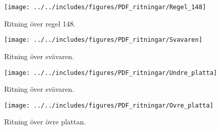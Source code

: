 \begin{landscape}
\begin{figure}[htbp!]
\centering
\texttt{[image: ../../includes/figures/PDF\_ritningar/Regel\_148]}
\caption{Ritning över regel 148.}
\label{fig:regel_148}
\end{figure}
\end{landscape}

\begin{landscape}
\begin{figure}[htbp!]
\centering
\texttt{[image: ../../includes/figures/PDF\_ritningar/Svavaren]}
\caption{Ritning över svävaren.}
\label{fig:Svavaren_full}
\end{figure}
\end{landscape}

\begin{landscape}
\begin{figure}[htbp!]
\centering
\texttt{[image: ../../includes/figures/PDF\_ritningar/Undre\_platta]}
\caption{Ritning över svävaren.}
\label{fig:Svavaren}
\end{figure}
\end{landscape}

\begin{landscape}
\begin{figure}[htbp!]
\centering
\texttt{[image: ../../includes/figures/PDF\_ritningar/Ovre\_platta]}
\caption{Ritning över övre plattan.}
\label{fig:Ovre_platta}
\end{figure}
\end{landscape}

